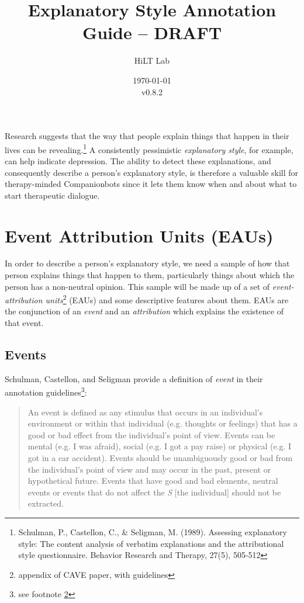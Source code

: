 \documentclass[a4paper,12pt]{article}
\begin{document}
\title{Explanatory Style Annotation Guide -- DRAFT}
\author{HiLT Lab}
\date{\today\\v0.8.2}
\maketitle

\tableofcontents
\break

Research suggests that the way that people explain things that happen in their lives can be revealing.\footnote{\label{seligman89}Schulman, P., Castellon, C., \& Seligman, M. (1989). Assessing explanatory style: The content analysis of verbatim explanations and the attributional style questionnaire. Behavior Research and Therapy, 27(5), 505-512} %
A consistently pessimistic \emph{explanatory style}, for example, can help indicate depression.
The ability to detect these explanations, and consequently describe a person's explanatory style, is therefore a valuable skill for therapy-minded Companionbots since it lets them know when and about what to start therapeutic dialogue.

\section{Event Attribution Units (EAUs)}
In order to describe a person's explanatory style, we need a sample of how that person explains things that happen to them, particularly things about which the person has a non-neutral opinion. %
This sample will be made up of a set of \emph{event-attribution units}\footnote{\label{CAVE}appendix of CAVE paper, with guidelines} (EAUs) and some descriptive features about them. %
EAUs are the conjunction of an \emph{event} and an \emph{attribution} which explains the existence of that event.


\subsection{Events}

Schulman, Castellon, and Seligman provide a definition of \emph{event} in their annotation guidelines\footnote{see footnote \ref{CAVE}}: %

\begin{quote}
    An event is defined as any stimulus that occurs in an individual's environment or within that individual (e.g. thoughts or feelings) that has a good or bad effect from the individual's point of view.
    Events can be mental (e.g. I was afraid), social (e.g. I got a pay raise) or physical (e.g. I got in a car accident).
    Events should be unambiguously good or bad from the individual's point of view and may occur in the past, present or hypothetical future.
    Events that have good and bad elements, neutral events or events that do not affect the \emph{S} [the individual] should not be extracted.
\end{quote}
\end{document}
